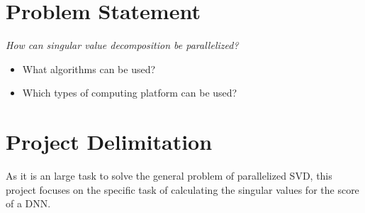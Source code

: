 \section{Problem Statement}

\textit{How can singular value decomposition be parallelized?}

\begin{itemize}
\item What algorithms can be used?
\item Which types of computing platform can be used?
\end{itemize}

\section{Project Delimitation}

As it is an large task to solve the general problem of parallelized SVD, this project focuses on the specific task of calculating the singular values for the score of a DNN.

